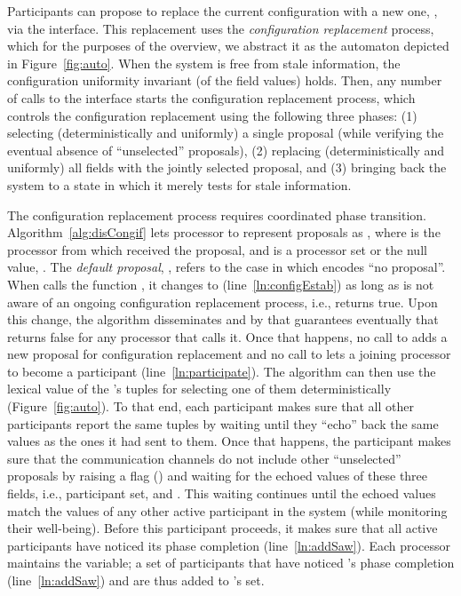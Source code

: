 \documentclass[11pt]{article}
\begin{document}
Participants can propose to replace the current configuration with a new one, , via the  interface. This replacement uses the {\em configuration replacement} process, which for the purposes of the overview, we abstract it as the automaton depicted in Figure~\ref{fig:auto}. When the system is free from stale information, the configuration uniformity invariant (of the  field values) holds. Then, any number of calls to the  interface starts the configuration replacement process, which controls the configuration replacement using the following three phases: (1) selecting (deterministically and uniformly) a single proposal (while verifying the eventual absence of ``unselected'' proposals), (2) replacing (deterministically and uniformly) all  fields with the jointly selected proposal, and (3) bringing back the system to a state in which it merely tests for stale information. 


The configuration replacement process requires coordinated phase transition.
Algorithm~\ref{alg:disCongif} lets processor  to represent proposals as , where  is the processor from which  received the proposal,  and  is a processor set or the null value, . The \emph{default proposal}, , refers to the case in which  encodes ``no proposal''. 
When  calls the function , it changes  to  (line~\ref{ln:configEstab}) as long as  is not aware of an ongoing configuration replacement process, i.e.,  returns true. Upon this change, the algorithm disseminates  and by that guarantees eventually that  returns false for any processor that calls it. Once that happens, no call to  adds a new proposal for configuration replacement and no call to  lets a joining processor to become a participant (line~\ref{ln:participate}). The algorithm can then use the lexical value of the 's tuples for selecting one of them deterministically (Figure~\ref{fig:auto}). To that end, each participant makes sure that all other participants report the same tuples by waiting until they ``echo'' back the same values as the ones it had sent to them. Once that happens, the participant  makes sure that the communication channels do not include other ``unselected'' proposals by raising a flag () and waiting for the echoed values of these three fields, i.e., participant set,  and . This waiting continues until the echoed values match the values of any other active participant in the system (while monitoring their well-being). Before this participant proceeds, it makes sure that all active participants have noticed its phase completion (line~\ref{ln:addSaw}). Each processor  maintains the  variable; a set of participants that have noticed 's phase completion (line~\ref{ln:addSaw}) and are thus added to 's  set.
\end{document}

